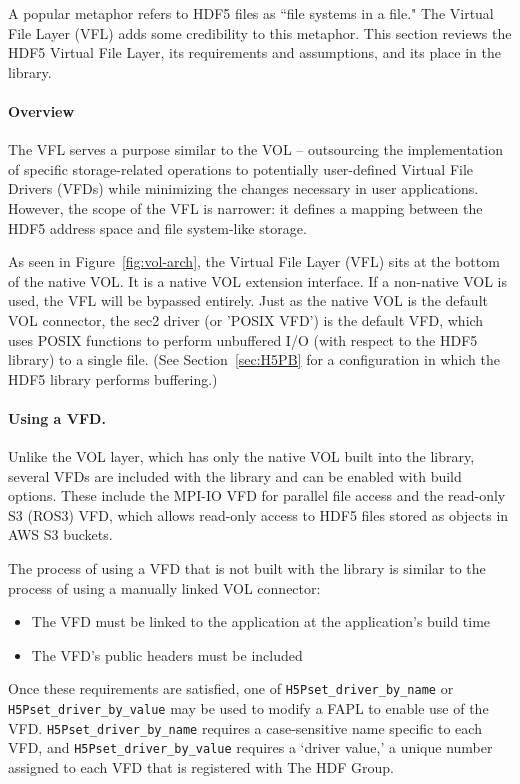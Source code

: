A popular metaphor refers to HDF5 files as ``file systems in a file." The Virtual File Layer (VFL) adds some credibility to this metaphor. This section reviews the HDF5 Virtual File Layer, its requirements and assumptions, and its place in the library.

\paragraph{Overview} The VFL serves a purpose similar to the VOL -- outsourcing the implementation of specific storage-related operations to potentially user-defined Virtual File Drivers (VFDs) while minimizing the changes necessary in user applications. However, the scope of the VFL is narrower: it defines a mapping between the HDF5 address space and file system-like storage. 

As seen in Figure~\ref{fig:vol-arch}, the Virtual File Layer (VFL) sits at the bottom of the native VOL. It is a native VOL extension interface. If a non-native VOL is used, the VFL will be bypassed entirely. Just as the native VOL is the default VOL connector, the sec2 driver (or 'POSIX VFD') is the default VFD, which uses POSIX functions to perform unbuffered I/O (with respect to the HDF5 library) to a single file. (See Section~\ref{sec:H5PB} for a configuration in which the HDF5 library performs buffering.)

\paragraph{Using a VFD.} Unlike the VOL layer, which has only the native VOL built into the library, several VFDs are included with the library and can be enabled with build options. These include the MPI-IO VFD for parallel file access and the read-only S3 (ROS3) VFD, which allows read-only access to HDF5 files stored as objects in AWS S3 buckets.

The process of using a VFD that is not built with the library is similar to the process of using a manually linked VOL connector:
\begin{itemize}
    \item The VFD must be linked to the application at the application's build time
    \item The VFD's public headers must be included 
\end{itemize}

Once these requirements are satisfied, one of \texttt{H5Pset\_driver\_by\_name} or \texttt{H5Pset\_driver\_by\_value} may be used to modify a FAPL to enable use of the VFD. \texttt{H5Pset\_driver\_by\_name} requires a case-sensitive name specific to each VFD, and \texttt{H5Pset\_driver\_by\_value} requires a `driver value,' a unique number assigned to each VFD that is registered with The HDF Group.

